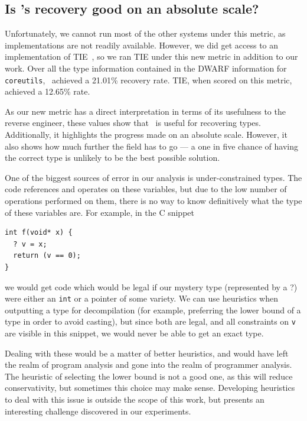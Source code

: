 \subsection{Is \bitr's recovery good on an absolute scale?}
Unfortunately, we cannot run most of the other systems under this metric, as implementations are not readily available. However, we did get access to an implementation of TIE~\cite{tie}, so we ran TIE under this new metric in addition to our work. Over all the type information contained in the DWARF information for \texttt{coreutils}, \bitr\ achieved a 21.01\% recovery rate. TIE, when scored on this metric, achieved a 12.65\% rate.

As our new metric has a direct interpretation in terms of its usefulness to the reverse engineer, these values show that \bitr\ is useful for recovering types. Additionally, it highlights the progress made on an absolute scale. However, it also shows how much further the field has to go --- a one in five chance of having the correct type is unlikely to be the best possible solution.

One of the biggest sources of error in our analysis is under-constrained types. The code references and operates on these variables, but due to the low number of operations performed on them, there is no way to know definitively what the type of these variables are. For example, in the C snippet
\begin{verbatim}
int f(void* x) {
  ? v = x;
  return (v == 0);
}
\end{verbatim}
we would get code which would be legal if our mystery type (represented by a ?) were either an \texttt{int} or a pointer of some variety. We can use heuristics when outputting a type for decompilation (for example, preferring the lower bound of a type in order to avoid casting), but since both are legal, and all constraints on \texttt{v} are visible in this snippet, we would never be able to get an exact type.

Dealing with these would be a matter of better heuristics, and would have left the realm of program analysis and gone into the realm of programmer analysis. The heuristic of selecting the lower bound is not a good one, as this will reduce conservativity, but sometimes this choice may make sense. Developing heuristics to deal with this issue is outside the scope of this work, but presents an interesting challenge discovered in our experiments.

